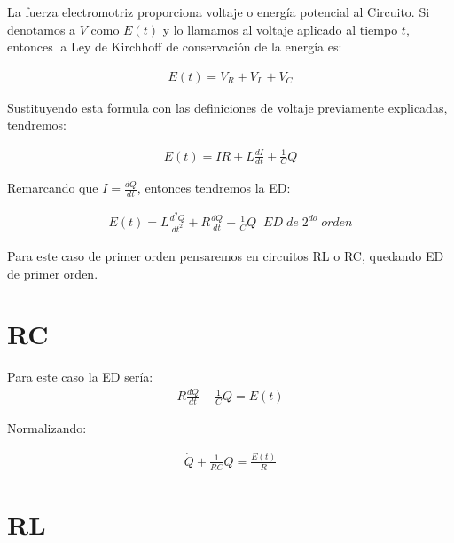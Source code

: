 La fuerza electromotriz proporciona voltaje o energía potencial al Circuito. Si denotamos a \(\displaystyle V\) como \(\displaystyle E(t)\) y lo llamamos al voltaje  aplicado al tiempo \(\displaystyle t\), entonces la Ley de Kirchhoff de conservación de la energía es:

\begin{equation*}
    \begin{gathered}
        E(t)=V_{R}+V_{L}+V_{C}
    \end{gathered}
\end{equation*}

Sustituyendo esta formula con las definiciones de voltaje previamente explicadas, tendremos:

\begin{equation*}
    \begin{gathered}
        E(t)=IR+L\frac{dI}{dt}+\frac{1}{C}Q
    \end{gathered}
\end{equation*}

Remarcando que \(\displaystyle I=\frac{dQ}{dt}\), entonces tendremos la ED:

\begin{equation*}
    \begin{gathered}
        E(t)=L\frac{d^{2}Q}{dt^{2}}+R\frac{dQ}{dt}+\frac{1}{C}Q\;\;ED\;de\;2^{do}\;orden
    \end{gathered}
\end{equation*}

Para este caso de primer orden pensaremos en circuitos RL o RC, quedando ED de primer orden.

\section{RC}
Para este caso la ED sería:
\begin{equation*}
    \begin{gathered}
        R\frac{dQ}{dt}+\frac{1}{C}Q=E(t)
    \end{gathered}
\end{equation*}

Normalizando:

\begin{equation*}
    \begin{gathered}
        \dot{Q}+\frac{1}{RC}Q=\frac{E(t)}{R}
    \end{gathered}
\end{equation*}

\section{RL}

